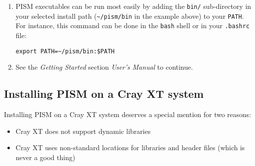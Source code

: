 \documentclass[titlepage,letterpaper,final]{scrartcl}
\begin{document}
\begin{enumerate}
If your operating system does not support shared libraries\footnote{This might be necessary if you're building on a Cray XT5 or a Sun Opteron Cluster, for example.}, then set \texttt{BUILD_SHARED_LIBS} to ``OFF''. This can be done by
either running
\begin{verbatim}
$  cmake -DBUILD_SHARED_LIBS:BOOL=OFF ..
\end{verbatim}%
or by using \texttt{ccmake}:\footnote{Install the \texttt{cmake-curses-gui} package to get \texttt{ccmake} on Ubuntu.} run
\begin{verbatim}
$  ccmake ..
\end{verbatim}%
and then change \texttt{BUILD_SHARED_LIBS} (press 'c' (configure), then 'g' (generate makefiles))
before \texttt{make install}.

You might also need to set \texttt{Pism_LINK_STATICALLY} on systems that do not
tolerate any compiler options related to shared libraries.

Object files created during the build process (located in the \texttt{build}
sub-directory) are not deleted after installing PISM, so do ``\texttt{make
  clean}'' to delete these if space is an issue. You can also delete the build
directory if you are not planning on re-compiling PISM.

\item PISM executables can be run most easily by adding the \texttt{bin/}
  sub-directory in your selected install path
  (\texttt{\textasciitilde/pism/bin} in the example above) to your
  \texttt{PATH}. For instance, this command can be done in the \texttt{bash}
  shell or in your \texttt{.bashrc} file:
\begin{verbatim}
export PATH=~/pism/bin:$PATH
\end{verbatim}

\item See the \emph{Getting Started} section \emph{User's Manual} to continue.
\end{enumerate}

\subsection{Installing PISM on a Cray XT system}
\label{sec:cray}

Installing PISM on a Cray XT system deserves a special mention for two reasons:
\begin{itemize}
\item Cray XT does not support dynamic libraries
\item Cray XT uses non-standard locations for libraries and header files (which
  is never a good thing)
\end{itemize}
\end{document}
